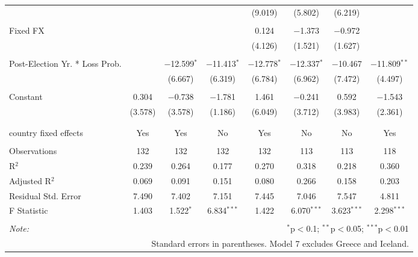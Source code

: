 \begin{tabular}{@{\extracolsep{5pt}}lccccccc}
  &  &  &  & (9.019) & (5.802) & (6.219) &  \\ 
  & & & & & & & \\ 
 Fixed FX &  &  &  & 0.124 & $-$1.373 & $-$0.972 &  \\ 
  &  &  &  & (4.126) & (1.521) & (1.627) &  \\ 
  & & & & & & & \\ 
 Post-Election Yr. * Loss Prob. &  & $-$12.599$^{*}$ & $-$11.413$^{*}$ & $-$12.778$^{*}$ & $-$12.337$^{*}$ & $-$10.467 & $-$11.809$^{**}$ \\ 
  &  & (6.667) & (6.319) & (6.784) & (6.962) & (7.472) & (4.497) \\ 
  & & & & & & & \\ 
 Constant & 0.304 & $-$0.738 & $-$1.781 & 1.461 & $-$0.241 & 0.592 & $-$1.543 \\ 
  & (3.578) & (3.578) & (1.186) & (6.049) & (3.712) & (3.983) & (2.361) \\ 
  & & & & & & & \\ 
\hline \\[-1.8ex] 
country fixed effects & Yes & Yes & No & Yes & No & No & Yes \\ 
\hline \\[-1.8ex] 
Observations & 132 & 132 & 132 & 132 & 113 & 113 & 118 \\ 
R$^{2}$ & 0.239 & 0.264 & 0.177 & 0.270 & 0.318 & 0.218 & 0.360 \\ 
Adjusted R$^{2}$ & 0.069 & 0.091 & 0.151 & 0.080 & 0.266 & 0.158 & 0.203 \\ 
Residual Std. Error & 7.490 & 7.402 & 7.151 & 7.445 & 7.046 & 7.547 & 4.811 \\ 
F Statistic & 1.403 & 1.522$^{*}$ & 6.834$^{***}$ & 1.422 & 6.070$^{***}$ & 3.623$^{***}$ & 2.298$^{***}$ \\ 
\hline 
\hline \\[-1.8ex] 
\textit{Note:}  & \multicolumn{7}{r}{$^{*}$p$<$0.1; $^{**}$p$<$0.05; $^{***}$p$<$0.01} \\ 
 & \multicolumn{7}{r}{Standard errors in parentheses. Model 7 excludes Greece and Iceland.} \\ 
\end{tabular} 
\endgroup 
